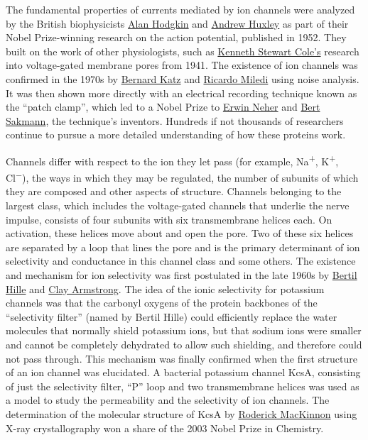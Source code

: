 The fundamental properties of currents mediated by ion channels were analyzed by the British biophysicists \href{https://en.wikipedia.org/wiki/Alan_Hodgkin}{Alan Hodgkin} and \href{https://en.wikipedia.org/wiki/Andrew_Huxley}{Andrew Huxley} as part of their Nobel Prize-winning research on the action potential, published in 1952. They built on the work of other physiologists, such as \href{https://en.wikipedia.org/wiki/Kenneth_Stewart_Cole}{Kenneth Stewart Cole's} research into voltage-gated membrane pores from 1941. The existence of ion channels was confirmed in the 1970s by \href{https://en.wikipedia.org/wiki/Bernard_Katz}{Bernard Katz} and \href{https://en.wikipedia.org/wiki/Ricardo_Miledi}{Ricardo Miledi} using noise analysis. It was then shown more directly with an electrical recording technique known as the ``patch clamp'', which led to a Nobel Prize to \href{https://en.wikipedia.org/wiki/Erwin_Neher}{Erwin Neher} and \href{https://en.wikipedia.org/wiki/Bert_Sakmann}{Bert Sakmann}, the technique's inventors. Hundreds if not thousands of researchers continue to pursue a more detailed understanding of how these proteins work.

Channels differ with respect to the ion they let pass (for example, Na\textsuperscript{+}, K\textsuperscript{+}, Cl\textsuperscript{−}), the ways in which they may be regulated, the number of subunits of which they are composed and other aspects of structure. Channels belonging to the largest class, which includes the voltage-gated channels that underlie the nerve impulse, consists of four subunits with six transmembrane helices each. On activation, these helices move about and open the pore. Two of these six helices are separated by a loop that lines the pore and is the primary determinant of ion selectivity and conductance in this channel class and some others. The existence and mechanism for ion selectivity was first postulated in the late 1960s by \href{https://en.wikipedia.org/wiki/Bertil_Hille}{Bertil Hille} and \href{https://en.wikipedia.org/wiki/Clay_Armstrong}{Clay Armstrong}. The idea of the ionic selectivity for potassium channels was that the carbonyl oxygens of the protein backbones of the ``selectivity filter'' (named by Bertil Hille) could efficiently replace the water molecules that normally shield potassium ions, but that sodium ions were smaller and cannot be completely dehydrated to allow such shielding, and therefore could not pass through. This mechanism was finally confirmed when the first structure of an ion channel was elucidated. A bacterial potassium channel KcsA, consisting of just the selectivity filter, ``P'' loop and two transmembrane helices was used as a model to study the permeability and the selectivity of ion channels. The determination of the molecular structure of KcsA by \href{https://en.wikipedia.org/wiki/Roderick_MacKinnon}{Roderick MacKinnon} using X-ray crystallography won a share of the 2003 Nobel Prize in Chemistry.

